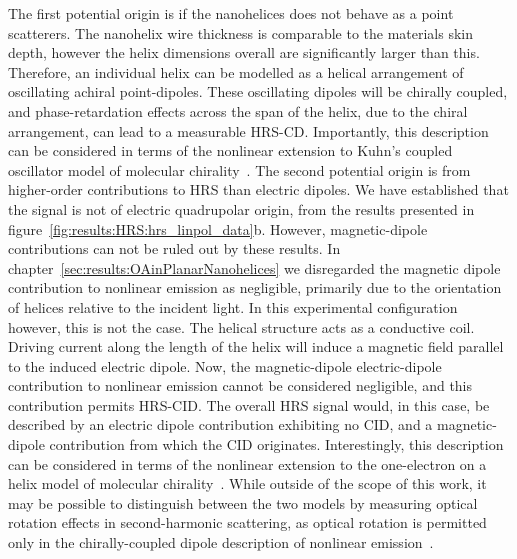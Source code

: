 The first potential origin is if the nanohelices does not behave as a point scatterers.
The nanohelix wire thickness is comparable to the materials skin depth, however the helix dimensions overall are significantly larger than this. Therefore, an individual helix can be modelled as a helical arrangement of oscillating achiral point-dipoles. These oscillating dipoles will be chirally coupled, and phase-retardation effects across the span of the helix, due to the chiral arrangement, can lead to a measurable HRS-CD.
Importantly, this description can be considered in terms of the nonlinear extension to Kuhn's coupled oscillator model of molecular chirality~\cite{Fischer2005a}.
The second potential origin is from higher-order contributions to HRS than electric dipoles. We have established that the signal is not of electric quadrupolar origin, from the results presented in figure~\ref{fig:results:HRS:hrs_linpol_data}b. However, magnetic-dipole contributions can not be ruled out by these results. 
In chapter~\ref{sec:results:OAinPlanarNanohelices} we disregarded the magnetic dipole contribution to nonlinear emission as negligible, primarily due to the orientation of helices relative to the incident light. In this experimental configuration however, this is not the case.
The helical structure acts as a conductive coil. Driving current along the length of the helix will induce a magnetic field parallel to the induced electric dipole. Now, the magnetic-dipole electric-dipole contribution to nonlinear emission cannot be considered negligible, and this contribution permits HRS-CID. The overall HRS signal would, in this case, be described by an electric dipole contribution exhibiting no CID, and a magnetic-dipole contribution from which the CID originates.
Interestingly, this description can be considered in terms of the nonlinear extension to the one-electron on a helix model of molecular chirality~\cite{Fischer2005a}.
While outside of the scope of this work, it may be possible to distinguish between the two models by measuring optical rotation effects in second-harmonic scattering, as optical rotation is permitted only in the chirally-coupled dipole description of nonlinear emission~\cite{Fischer2005a}.

